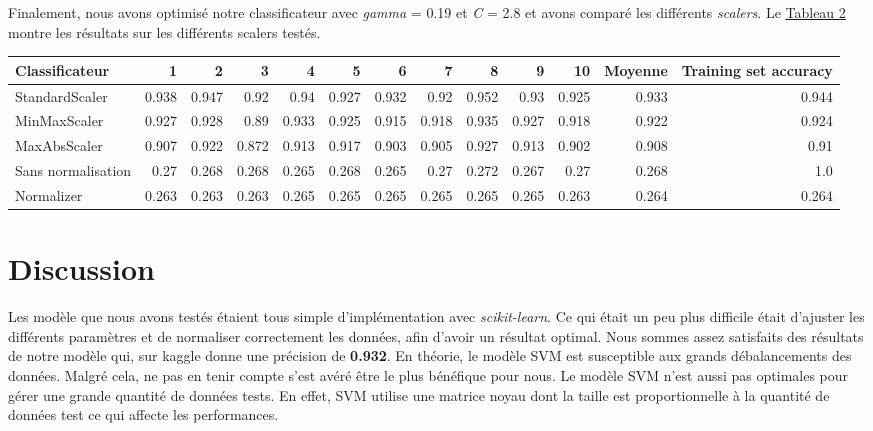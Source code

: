 \documentclass[12pt]{extarticle}
\begin{document}
Finalement, nous avons optimisé notre classificateur avec \emph{gamma} = 0.19 et \emph{C} = 2.8 et avons comparé les différents \emph{scalers}. Le \hyperref[scalers]{Tableau 2} montre les résultats sur les différents scalers testés.
\vspace{2mm}
\vspace*{-5mm}
\label{scalers}
{\scriptsize
\begin{center}
\begin{tabular}{|l|r|r|r|r|r|r|r|r|r|r|r|r|}
\hline
Classificateur & 1 & 2 & 3 & 4 & 5 & 6 & 7 & 8 & 9 & 10 & \textbf{Moyenne} & \textbf{Training set accuracy}\\
\hline
StandardScaler & 0.938 & 0.947 & 0.92 & 0.94 & 0.927 & 0.932 & 0.92 & 0.952 & 0.93 & 0.925 & 0.933 & 0.944\\
\hline
MinMaxScaler & 0.927 & 0.928 & 0.89 & 0.933 & 0.925 & 0.915 & 0.918 & 0.935 & 0.927 & 0.918 & 0.922 & 0.924\\
\hline
MaxAbsScaler & 0.907 & 0.922 & 0.872 & 0.913 & 0.917 & 0.903 & 0.905 & 0.927 & 0.913 & 0.902 & 0.908 & 0.91\\
\hline
Sans normalisation & 0.27 & 0.268 & 0.268 & 0.265 & 0.268 & 0.265 & 0.27 & 0.272 & 0.267 & 0.27 & 0.268 & 1.0\\
\hline
Normalizer & 0.263 & 0.263 & 0.263 & 0.265 & 0.265 & 0.265 & 0.265 & 0.265 & 0.265 & 0.263 & 0.264 & 0.264\\
\hline
\end{tabular}
\end{center}
}

\section{Discussion}
\label{sec:orgc899211}
\setlength\parindent{20pt}Les modèle que nous avons testés étaient tous simple d'implémentation avec \emph{scikit-learn}. Ce qui était un peu plus difficile était d'ajuster les différents paramètres et de normaliser correctement les données, afin d'avoir un résultat optimal. Nous sommes assez satisfaits des résultats de notre modèle qui, sur kaggle donne une précision de \textbf{0.932}. En théorie, le modèle SVM est susceptible aux grands débalancements des données. Malgré cela, ne pas en tenir compte s'est avéré être le plus bénéfique pour nous. Le modèle SVM n'est aussi pas optimales pour gérer une grande quantité de données tests. En effet, SVM utilise une matrice noyau dont la taille est proportionnelle à la quantité de données test ce qui affecte les performances.
\end{document}

